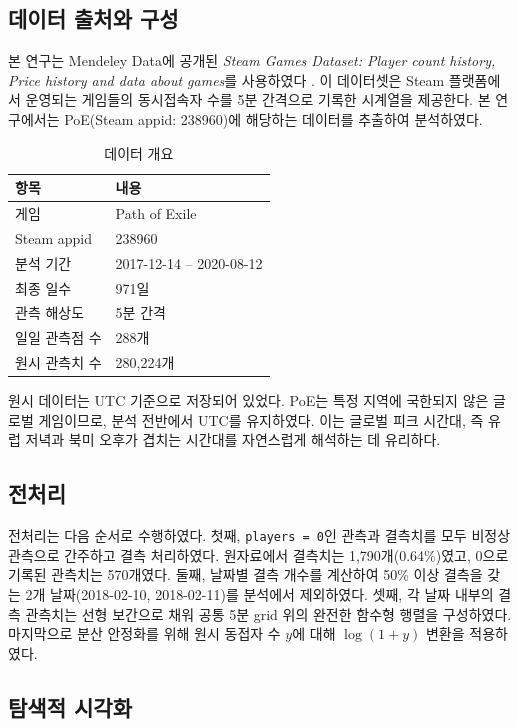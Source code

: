 \documentclass[11pt,a4paper]{article}
\begin{document}
\subsection{데이터 출처와 구성}
본 연구는 Mendeley Data에 공개된 \textit{Steam Games Dataset: Player count history, Price history and data about games}를 사용하였다 \citep{wannigamage2020steam}. 이 데이터셋은 Steam 플랫폼에서 운영되는 게임들의 동시접속자 수를 5분 간격으로 기록한 시계열을 제공한다. 본 연구에서는 PoE(Steam appid: 238960)에 해당하는 데이터를 추출하여 분석하였다.

\begin{table}[H]
\centering
\caption{데이터 개요}
\begin{tabular}{ll}
\toprule
항목 & 내용 \\
\midrule
게임 & Path of Exile \\
Steam appid & 238960 \\
분석 기간 & 2017-12-14 -- 2020-08-12 \\
최종 일수 & 971일 \\
관측 해상도 & 5분 간격 \\
일일 관측점 수 & 288개 \\
원시 관측치 수 & 280,224개 \\
\bottomrule
\end{tabular}
\end{table}

원시 데이터는 UTC 기준으로 저장되어 있었다. PoE는 특정 지역에 국한되지 않은 글로벌 게임이므로, 분석 전반에서 UTC를 유지하였다. 이는 글로벌 피크 시간대, 즉 유럽 저녁과 북미 오후가 겹치는 시간대를 자연스럽게 해석하는 데 유리하다.

\subsection{전처리}
전처리는 다음 순서로 수행하였다. 첫째, \texttt{players = 0}인 관측과 결측치를 모두 비정상 관측으로 간주하고 결측 처리하였다. 원자료에서 결측치는 1,790개(0.64\%)였고, 0으로 기록된 관측치는 570개였다. 둘째, 날짜별 결측 개수를 계산하여 50\% 이상 결측을 갖는 2개 날짜(2018-02-10, 2018-02-11)를 분석에서 제외하였다. 셋째, 각 날짜 내부의 결측 관측치는 선형 보간으로 채워 공통 5분 grid 위의 완전한 함수형 행렬을 구성하였다. 마지막으로 분산 안정화를 위해 원시 동접자 수 $y$에 대해 $\log(1+y)$ 변환을 적용하였다.

\subsection{탐색적 시각화}
\end{document}
